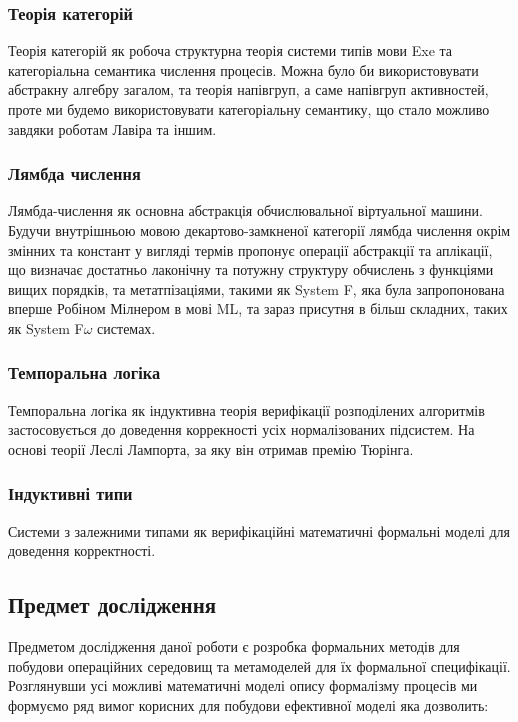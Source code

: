\documentclass[11pt,oneside]{article}
\begin{document}
\newpage
   \subsubsection*{Теорія категорій}
   Теорія категорій як робоча структурна теорія системи типів мови Exe та
   категоріальна семантика числення процесів. Можна було би використовувати абстракну алгебру загалом,
   та теорія напівгруп, а саме напівгруп активностей, проте ми будемо використовувати
   категоріальну семантику, що стало можливо завдяки роботам Лавіра та іншим.\\

   \subsubsection*{Лямбда числення}
   Лямбда-числення як основна абстракція обчислювальної віртуальної машини.
   Будучи внутрішньою мовою декартово-замкненої категорії лямбда числення окрім змінних
   та констант у вигляді термів пропонує операції абстракції та аплікації, що визначає
   достатньо лаконічну та потужну структуру обчислень з функціями вищих порядків,
   та метатпізаціями, такими як System F, яка була запропонована
   вперше Робіном Мілнером в мові ML, та зараз присутня в більш складних,
   таких як System F$\omega$ системах.

   \subsubsection*{Темпоральна логіка}
   Темпоральна логіка як індуктивна теорія верифікації розподілених алгоритмів
   застосовується до доведення коррекності усіх нормалізованих підсистем. На основі
   теорії \cite{tla} Леслі Лампорта, за яку він отримав премію Тюрінга. \\

   \subsubsection*{Індуктивні типи}
   Системи з залежними типами як верифікаційні математичні формальні моделі
   для доведення корректності.

\newpage
\subsection{Предмет дослідження}
\vspace{0.5cm}

   Предметом дослідження даної роботи є розробка формальних методів для побудови
   операційних середовищ та метамоделей для їх формальної специфікації. Розглянувши усі
   можливі математичні моделі опису формалізму процесів ми формуємо ряд вимог корисних
   для побудови ефективної моделі яка дозволить:
\end{document}
